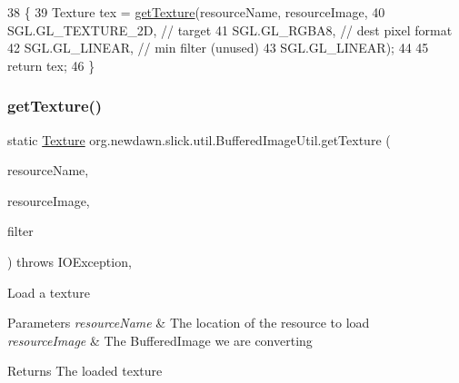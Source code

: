 \begin{DoxyCode}
38                                                             \{
39         Texture tex = \mbox{\hyperlink{classorg_1_1newdawn_1_1slick_1_1util_1_1_buffered_image_util_a60639f0e446fa211b987096681b98615}{getTexture}}(resourceName, resourceImage,
40                 SGL.GL\_TEXTURE\_2D, \textcolor{comment}{// target}
41                 SGL.GL\_RGBA8, \textcolor{comment}{// dest pixel format}
42                 SGL.GL\_LINEAR, \textcolor{comment}{// min filter (unused)}
43                 SGL.GL\_LINEAR);
44 
45         \textcolor{keywordflow}{return} tex;
46     \}
\end{DoxyCode}
\mbox{\label{classorg_1_1newdawn_1_1slick_1_1util_1_1_buffered_image_util_aab5af0fd218410addd8f7feff0bbf8f4}} 
\subsubsection{\texorpdfstring{get\+Texture()}{getTexture()}\hspace{0.1cm}{\footnotesize\ttfamily [2/3]}}
{\footnotesize\ttfamily static \mbox{\hyperlink{interfaceorg_1_1newdawn_1_1slick_1_1opengl_1_1_texture}{Texture}} org.\+newdawn.\+slick.\+util.\+Buffered\+Image\+Util.\+get\+Texture (\begin{DoxyParamCaption}\item[{String}]{resource\+Name,  }\item[{Buffered\+Image}]{resource\+Image,  }\item[{int}]{filter }\end{DoxyParamCaption}) throws I\+O\+Exception\hspace{0.3cm}{\ttfamily [inline]}, {\ttfamily [static]}}

Load a texture


\begin{DoxyParams}{Parameters}
{\em resource\+Name} & The location of the resource to load \\
\hline
{\em resource\+Image} & The Buffered\+Image we are converting \\
\hline
\end{DoxyParams}
\begin{DoxyReturn}{Returns}
The loaded texture 
\end{DoxyReturn}

